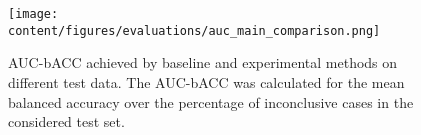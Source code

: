 \begin{figure}[ht]
  \centering
  \texttt{[image: content/figures/evaluations/auc\_main\_comparison.png]}
  \caption{AUC-bACC achieved by baseline and experimental methods on different test data. 
  The AUC-bACC was calculated for the mean balanced accuracy over the percentage of inconclusive cases 
  in the considered test set.} 
  \label{fig:auc_comparison_methods_data}
\end{figure} 